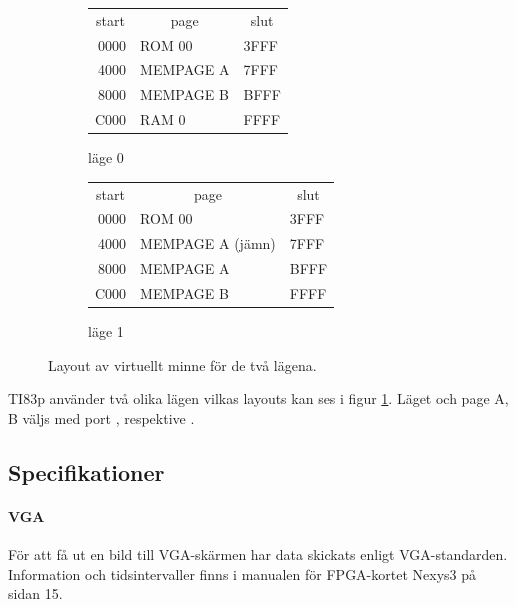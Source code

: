 \documentclass[main.tex]{subfiles}
\begin{document}
\begin{figure}[b]
    \begin{subfigure}{0.5\textwidth}
        \center
        \ttfamily
        \begin{tabular}{r|m{3.5cm}|l}
            \multicolumn{1}{c}{\normalfont start} &
            \multicolumn{1}{c}{\normalfont page} &
            \multicolumn{1}{c}{\normalfont slut} \\ \cline{2-2}
            0000 & ROM 00    & 3FFF \\ \cline{2-2}
            4000 & MEMPAGE A & 7FFF \\ \cline{2-2}
            8000 & MEMPAGE B & BFFF \\ \cline{2-2}
            C000 & RAM 0     & FFFF \\ \cline{2-2}
        \end{tabular}
        \caption{läge 0}
    \end{subfigure}
    \begin{subfigure}{0.5\textwidth}
        \center
        \ttfamily
        \begin{tabular}{r|m{3.5cm}|l}
            \multicolumn{1}{c}{\normalfont start} &
            \multicolumn{1}{c}{\normalfont page} &
            \multicolumn{1}{c}{\normalfont slut} \\ \cline{2-2}
            0000 & ROM 00           & 3FFF \\ \cline{2-2}
            4000 & MEMPAGE A (jämn) & 7FFF \\ \cline{2-2}
            8000 & MEMPAGE A        & BFFF \\ \cline{2-2}
            C000 & MEMPAGE B        & FFFF \\ \cline{2-2}
        \end{tabular}
        \caption{läge 1}
    \end{subfigure}
    \caption{Layout av virtuellt minne för de två lägena.}
    \label{fig:virtual}
\end{figure}

TI83p använder två olika lägen vilkas layouts kan ses i figur
\ref{fig:virtual}. Läget och page A, B väljs med port , 
respektive . \cite{wikiti-mmap}

\subsection{Specifikationer}

\paragraph{VGA}
För att få ut en bild till VGA-skärmen har data skickats enligt
VGA-standarden. Information och tidsintervaller finns i manualen för
FPGA-kortet Nexys3 på sidan 15.\cite{Nexys3}
\end{document}
